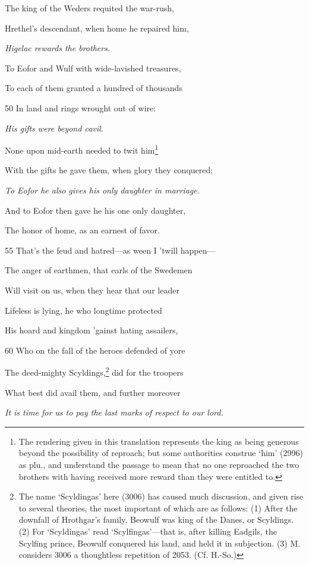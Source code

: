 The king of the Weders requited the war-rush,

Hrethel’s descendant, when home he repaired him,

\emph{Higelac rewards
the brothers.}

To Eofor and Wulf with wide-lavished treasures,

To each of them granted a hundred of thousands

50
In land and rings wrought out of wire:

\emph{His gifts were beyond
cavil.}

None upon mid-earth needed to twit him\footnote{The rendering given in this translation represents the king as being generous
beyond the possibility of reproach; but some authorities construe ‘him’
(2996) as plu., and understand the passage to mean that no one reproached
the two brothers with having received more reward than they were entitled to.}

With the gifts he gave them, when glory they conquered;

\emph{To Eofor he also
gives his only
daughter in marriage.}

And to Eofor then gave he his one only daughter,

The honor of home, as an earnest of favor.

55
That’s the feud and hatred—as ween I ’twill happen—

The anger of earthmen, that earls of the Swedemen

Will visit on us, when they hear that our leader

Lifeless is lying, he who longtime protected

His hoard and kingdom ’gainst hating assailers,

60
Who on the fall of the heroes defended of yore

The deed-mighty Scyldings,\footnote{The name ‘Scyldingas’ here (3006) has caused much discussion, and given
rise to several theories, the most important of which are as follows: (1) After
the downfall of Hrothgar’s family, Beowulf was king of the Danes, or Scyldings.
(2) For ‘Scyldingas’ read ‘Scylfingas’—that is, after killing Eadgils,
the Scylfing prince, Beowulf conquered his land, and held it in subjection.
(3) M. considers 3006 a thoughtless repetition of 2053. (Cf. H.-So.)} did for the troopers

What best did avail them, and further moreover

\emph{It is time for us to
pay the last marks
of respect to our
lord.}

